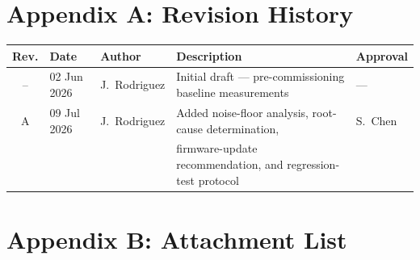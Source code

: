 \documentclass[11pt,letterpaper]{article}
\begin{document}
\newpage
\section*{Appendix A: Revision History}

\vspace{4pt}

\begin{center}
\begin{tabular}{@{}cllp{58mm}l@{}}
\toprule
\textbf{Rev.} & \textbf{Date}       & \textbf{Author}      & \textbf{Description}                                                & \textbf{Approval} \\
\midrule
--            & 02 Jun 2026         & J.\ Rodriguez        & Initial draft --- pre-commissioning baseline measurements           & --- \\
A             & 09 Jul 2026         & J.\ Rodriguez        & Added noise-floor analysis, root-cause determination,               & S.\ Chen \\
              &                     &                      & firmware-update recommendation, and regression-test protocol        & \\
\bottomrule
\end{tabular}
\end{center}

\section*{Appendix B: Attachment List}

\vspace{4pt}
\end{document}
